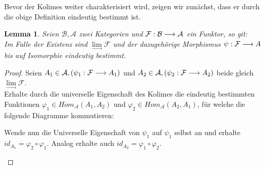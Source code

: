 \documentclass[10pt,a4paper]{report}
\newcommand{\comment}[1]{}
\newcounter{Aussage}[chapter]
\newtheorem{lemma}[Aussage]{Lemma}
\newcommand{\functionfront}[3]{\nolinebreak{#1:#2 \longrightarrow #3}}
\newcommand{\colimes}[0]{\lim\limits_{ \longrightarrow }}
\begin{document}
Bevor der Kolimes weiter charakterisiert wird, zeigen wir zunächst, dass er durch die obige Definition eindeutig bestimmt ist.
\begin{lemma}
Seien $\mathcal{B},\mathcal{A}$ zwei Kategorien und $\functionfront{\mathcal{F}}{\mathcal{B}}{\mathcal{A}}$ ein Funktor, so git:\\ 
Im Falle der Existenz sind $\colimes \mathcal{F}$ und der dazugehörige Morphismus $\functionfront{\psi}{\mathcal{F}}{A}$ bis auf Isomorphie eindeutig bestimmt.
\end{lemma}
\begin{proof}
Seien $A_1 \in \mathcal{A}, (\functionfront{\psi_1}{\mathcal{F}}{A_1}) $ und $A_2 \in \mathcal{A} , (\functionfront{\psi_2}{\mathcal{F}}{A_2}) $ beide gleich $\colimes \mathcal{F}$.\\
Erhalte durch die universelle Eigenschaft des Kolimes die eindeutig bestimmten Funktionen $\varphi_1 \in Hom_{\mathcal{A}}(A_1,A_2)$ und $\varphi_2 \in Hom_{\mathcal{A}}(A_2,A_1)$, für welche die folgende Diagramme kommutieren:

\comment{$\functionfront{\varphi_1}{\mathcal{A}_1}{\mathcal{A}_2}$ und $\functionfront{\varphi_2}{\mathcal{A}_2}{\mathcal{A}_1}$}
\begin{center}
\end{center}
\begin{flushleft}
Wende nun die Universelle Eigenschaft von $\psi_1$ auf $\psi_1$ selbst an und erhalte $id_{A_1} = \varphi_2 \circ \varphi_1$. Analog erhalte auch $id_{A_2} = \varphi_1 \circ \varphi_2$.
\end{flushleft}
\begin{center}
\end{center}
\end{proof}
\end{document}
